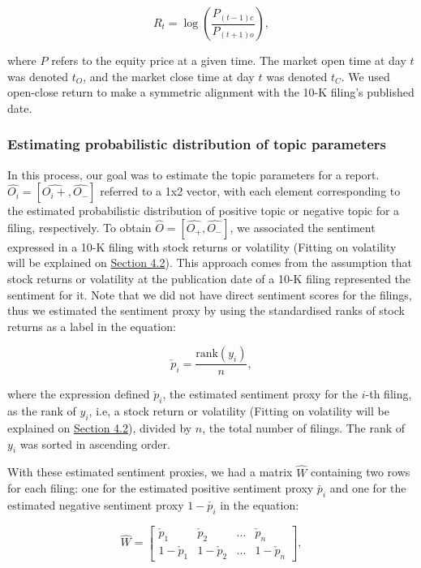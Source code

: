 \documentclass[logo,bsc,singlespacing,parskip]{infthesis}
\begin{document}
\begin{equation} \label{4.4}
R_t = \log\left(\frac{P_{(t-1)c}}{P_{(t+1)o}}\right),
\end{equation}

where $P$ refers to the equity price at a given time. The market open time at day $t$ was denoted $t_O$, and the market close time at day $t$ was denoted $t_C$. We used open-close return to make a symmetric alignment with the 10-K filing’s published date.

\subsubsection{Estimating probabilistic distribution of topic parameters}

In this process, our goal was to estimate the topic parameters for a report. $\hat{O_i} =[\hat{O_i+},\hat{O_-}]$ referred to a 1x2 vector, with each element corresponding to the estimated probabilistic distribution of positive topic or negative topic for a filing, respectively. To obtain $\hat{O} =[\hat{O_+},\hat{O_-}]$, we associated the sentiment expressed in a 10-K filing with stock returns or volatility (Fitting on volatility will be explained on \hyperref[sec:volatility_label]{Section 4.2}). This approach comes from the assumption that stock returns or volatility at the publication date of a 10-K filing represented the sentiment for it. Note that we did not have direct sentiment scores for the filings, thus we estimated the sentiment proxy by using the standardised ranks of stock returns as a label in the equation:

\begin{equation} \label{4.5}
\check{p}_i = \frac{\text{rank}(y_i)}{n},
\end{equation}

where the expression defined $\check{p}_i$, the estimated sentiment proxy for the $i$-th filing, as the rank of $y_i$, i.e, a stock return or volatility (Fitting on volatility will be explained on \hyperref[sec:volatility_label]{Section 4.2}), divided by $n$, the total number of filings. The rank of $y_i$ was sorted in ascending order. 

With these estimated sentiment proxies, we had a matrix $\hat{W}$ containing two rows for each filing: one for the estimated positive sentiment proxy $\check{p_i}$ and one for the estimated negative sentiment proxy $1-\check{p_i}$ in the equation:

\begin{equation} \label{4.6}
\hat{W} = \begin{bmatrix}    \check{p}_1 & \check{p}_2 & \dots & \check{p}_n \\    1-\check{p}_1 & 1-\check{p}_2 & \dots & 1-\check{p}_n\end{bmatrix},
\end{equation}
\end{document}
